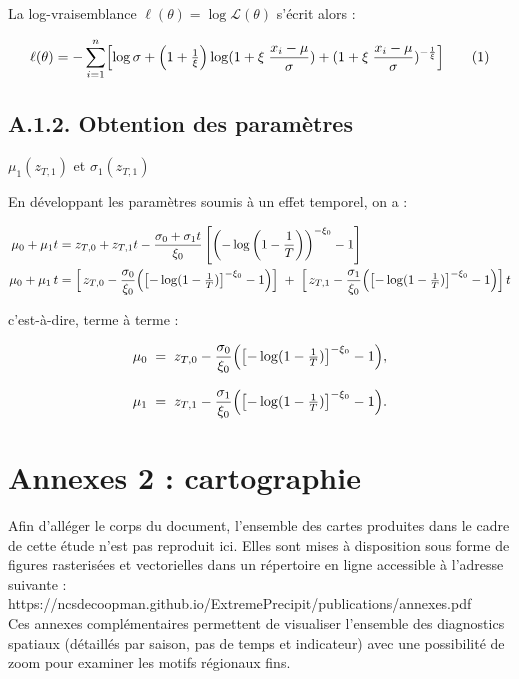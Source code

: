 \documentclass[
  article,
  nofooter,
  noheadings]{jss}
\begin{document}
La log-vraisemblance \(\ell(\theta) = \log \mathcal{L}(\theta)\) s'écrit
alors :

\[
\ell(\theta)=
-\sum_{i=1}^n\Bigl[
\log\sigma
+\Bigl(1+\tfrac1{\xi}\Bigr)\log (1+\xi\;\frac{x_i-\mu}{\sigma})
+(1+\xi\;\frac{x_i-\mu}{\sigma})^{-\frac{1}{\xi}}
\Bigr]
\tag{1}
\]

\subsection*{A.1.2. Obtention des
paramètres}\label{a.1.2.-obtention-des-paramuxe8tres}

\(\mu_1(z_{T,1})\) et \(\sigma_1(z_{T,1})\)

En développant les paramètres soumis à un effet temporel, on a :

\[
\begin{aligned}
\mu_0 + \mu_1 t &= z_{T,0} + z_{T,1} t - \dfrac{\sigma_0 + \sigma_1 t}{\xi_0} \left[ \left( -\log\left(1 - \frac{1}{T} \right) \right)^{-\xi_0} - 1 \right]\\
\mu_0+\mu_1\,t &= \Bigl[\,z_{T,0}
-\dfrac{\sigma_0}{\xi_0}\Bigl(\bigl[-\log(1-\tfrac1T)\bigr]^{-\xi_0}-1\Bigr)
\Bigr]\;+\;\Bigl[\,z_{T,1}-\dfrac{\sigma_1}{\xi_0}\Bigl(\bigl[-\log(1-\tfrac1T)\bigr]^{-\xi_0}-1\Bigr)\Bigr]\,t\\
\end{aligned}
\]

c'est-à-dire, terme à terme :

\[
\begin{aligned}
\mu_0 &\;=\; z_{T,0}
-\dfrac{\sigma_0}{\xi_0}\Bigl(\bigl[-\log(1-\tfrac1T)\bigr]^{-\xi_0}-1\Bigr),\\[0.8em]
\mu_1 &\;=\; z_{T,1}
-\dfrac{\sigma_1}{\xi_0}\Bigl(\bigl[-\log(1-\tfrac1T)\bigr]^{-\xi_0}-1\Bigr).
\end{aligned}
\]

\section*{Annexes 2 : cartographie}\label{annexes-2-cartographie}

Afin d'alléger le corps du document, l'ensemble des cartes produites
dans le cadre de cette étude n'est pas reproduit ici. Elles sont mises à
disposition sous forme de figures rasterisées et vectorielles dans un
répertoire en ligne accessible à l'adresse suivante :\\

https://ncsdecoopman.github.io/ExtremePrecipit/publications/annexes.pdf\\

Ces annexes complémentaires permettent de visualiser l'ensemble des
diagnostics spatiaux (détaillés par saison, pas de temps et indicateur)
avec une possibilité de zoom pour examiner les motifs régionaux fins.
\end{document}
